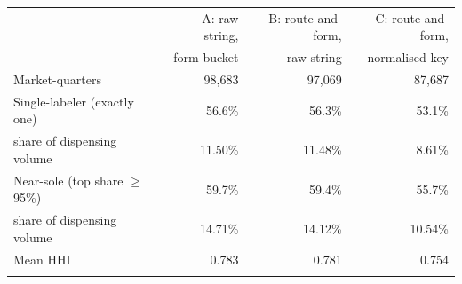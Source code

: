 \begin{tabular}{@{}lrrr@{}}
\toprule
 & A: raw string, & B: route-and-form, & C: route-and-form, \\
 & form bucket & raw string & normalised key \\
\midrule
Market-quarters                                  & 98{,}683 & 97{,}069 & 87{,}687 \\
\midrule
Single-labeler (exactly one)                     & 56.6\% & 56.3\% & 53.1\% \\
\quad share of dispensing volume                 & 11.50\% & 11.48\% & 8.61\% \\
Near-sole (top share $\geq$ 95\%)                & 59.7\% & 59.4\% & 55.7\% \\
\quad share of dispensing volume                 & 14.71\% & 14.12\% & 10.54\% \\
Mean HHI                                         & 0.783 & 0.781 & 0.754 \\
\botrule
\end{tabular}